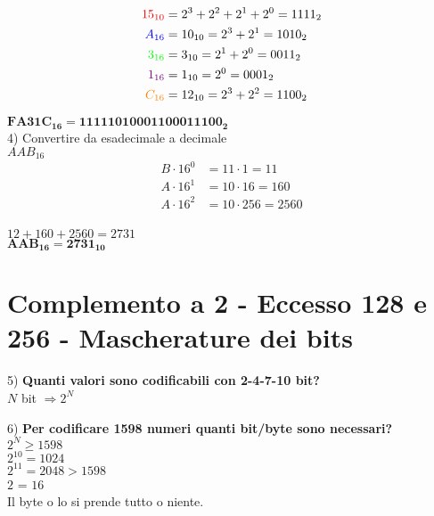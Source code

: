 \documentclass[a4paper, 12pt]{article} %
\begin{document}
\begin{align*}
	\color{red}15_{10} &= 2^3 + 2^2 + 2^1 + 2^0 = 1111_2 \\
	\color{blue}A_{16} &= 10_{10} = 2^3 + 2^1 = 1010_2 \\
	\color{green}3_{16} &= 3_{10} = 2^1 + 2^0 = 0011_2 \\
	\color{violet}1_{16} &= 1_{10} = 2^0 = 0001_2 \\
	\color{orange}C_{16} &= 12_{10} = 2^3 + 2^2 = 1100_2 \\
\end{align*}

$\mathbf{FA31C_{16} = 11111010001100011100_2}$ \\


\textsf{\large{\color{red} 4) Convertire da esadecimale a decimale}} \\

$ AAB_{16} $ \\

\begin{align*}
	B \cdot 16^0 &= 11 \cdot 1 = 11 \\
	A \cdot 16^1 &= 10 \cdot 16 = 160 \\
	A \cdot 16^2 &= 10 \cdot 256 = 2560 \\
\end{align*}

$ 12 + 160 + 2560 = 2731 $ \\
$ \mathbf{AAB_{16} = 2731_{10}} $ \\


\newpage

\section{Complemento a 2 - Eccesso 128 e 256 - Mascherature dei bits}

\textsf{\large{\color{red} 5) \textbf{\normalcolor Quanti valori sono codificabili con 2-4-7-10 bit?}}} \\

\textsf{\normalsize{$N$ bit $ \Longrightarrow 2^N$}} \break

\textsf{\large{\color{red} 6) \textbf{\normalcolor Per codificare 1598 numeri quanti bit/byte sono necessari?}}} \\

$ 2^N \geq 1598 $ \\ $ 2^{10} = 1024 $ \\ $ 2^{11} = 2048 > 1598 $ \\
$2$  = $16$  \\
\textsf{\normalsize{Il byte o lo si prende tutto o niente.}} \\
\end{document}
